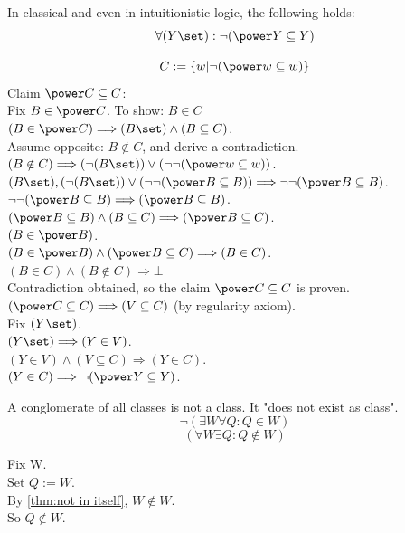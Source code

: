 \begin{theorem}
\label{thm:powerset not a subset}
In classical and even in intuitionistic logic, the following holds:
\[ \forall (Y\set): \neg(\power Y \subseteq Y)\]
\end{theorem}
\Proof
\noindent %
\[
C:=\{w|\neg(\power w \subseteq w)\}
\]
Claim $\power C \subseteq C$:\\
Fix $B\in \power C$. To show: $B\in C$\\
$(B\in \power C)\Longrightarrow (B\set)\land(B\subseteq C)$.\\
Assume opposite: $B\notin C$, and derive a contradiction.\\
$(B\notin C) \Longrightarrow (\neg(B\set))\lor (\neg\neg(\power w\subseteq w))$.\\
$(B\set), (\neg(B\set))\lor (\neg\neg(\power B\subseteq B)) \Longrightarrow \neg\neg(\power B\subseteq B)$.\\
$\neg\neg(\power B\subseteq B)  \Longrightarrow (\power B\subseteq B)$.\\
$ (\power B\subseteq B) \land (B\subseteq C) \Longrightarrow (\power B\subseteq C)$.\\
$(B\in \power B)$.\\
$(B\in \power B)\land (\power B\subseteq C) \Longrightarrow (B\in C)$.\\
$(B\in C) \land (B\notin C)  \Longrightarrow \bot$\\
Contradiction obtained, so the claim $\power C \subseteq C$ is proven.\\
$(\power C \subseteq C)\Longrightarrow (V\subseteq C)$ (by regularity axiom).\\
Fix $(Y\set)$.\\
$(Y\set)\Longrightarrow (Y\in V)$.\\
$(Y\in V)\land (V\subseteq C) \Longrightarrow (Y\in C)$.\\
$(Y\in C)\Longrightarrow \neg(\power Y\subseteq Y)$.\\
\Done

\begin{theorem}
\label{thm:conglomerate of classes not class}
A conglomerate of all classes is not a class. It "does not exist as class".
\[
\neg (\exists W \forall Q: Q\in W)
\]
\[
(\forall W \exists Q: Q\notin W)
\]
\end{theorem}
\Proof
Fix W.\\
Set $Q:=W$.\\
By \ref{thm:not in itself}, $W\notin W$.\\
So $Q\notin W$.\\
\Done
